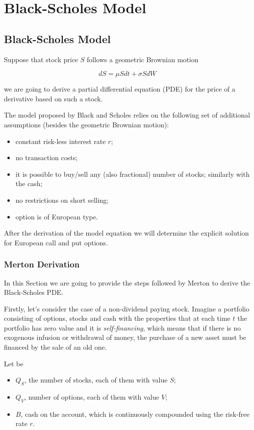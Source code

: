\chapter{Black-Scholes Model}
\label{ch:BS}

\section{Black-Scholes Model}
Suppose that stock price $S$ follows a geometric Brownian motion

\begin{equation}
dS = \mu Sdt + \sigma SdW
\label{eq:bs_gbm}
\end{equation}

we are going to derive a partial differential equation (PDE) for the price of a derivative based on such a stock.

The model proposed by Black and Scholes relies on the following set of additional assumptions (besides the geometric Brownian motion):
\begin{itemize}
\tightlist 
\item constant risk-less interest rate $r$;
\item no transaction costs;
\item it is possible to buy/sell any (also fractional) number of stocks; similarly with the cash;
\item no restrictions on short selling;
\item option is of European type.
\end{itemize}

After the derivation of the model equation we will determine the explicit solution for European call and put options.

\subsection{Merton Derivation}
In this Section we are going to provide the steps followed by Merton to derive the Black-Scholes PDE.

Firstly, let's consider the case of a non-dividend paying stock. Imagine a portfolio consisting of options, stocks and cash with the properties that at each time $t$ the portfolio has zero value and it is \emph{self-financing}, which means that if there is no exogenous infusion or withdrawal of money, the purchase of a new asset must be financed by the sale of an old one.

Let be 
\begin{itemize}
\item $Q_S$, the number of stocks, each of them with value $S$;
\item $Q_V$, number of options, each of them with value $V$;
\item $B$, cash on the account, which is continuously compounded using the risk-free rate $r$.
\end{itemize}

